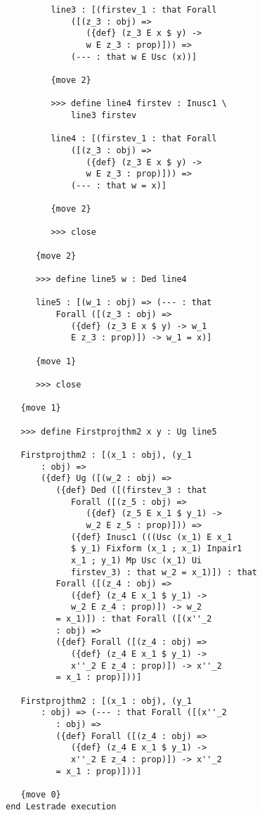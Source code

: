 \documentclass[12pt]{article}
\begin{document}
\begin{verbatim}
         line3 : [(firstev_1 : that Forall 
             ([(z_3 : obj) => 
                ({def} (z_3 E x $ y) -> 
                w E z_3 : prop)])) => 
             (--- : that w E Usc (x))]

         {move 2}

         >>> define line4 firstev : Inusc1 \
             line3 firstev

         line4 : [(firstev_1 : that Forall 
             ([(z_3 : obj) => 
                ({def} (z_3 E x $ y) -> 
                w E z_3 : prop)])) => 
             (--- : that w = x)]

         {move 2}

         >>> close

      {move 2}

      >>> define line5 w : Ded line4

      line5 : [(w_1 : obj) => (--- : that 
          Forall ([(z_3 : obj) => 
             ({def} (z_3 E x $ y) -> w_1 
             E z_3 : prop)]) -> w_1 = x)]

      {move 1}

      >>> close

   {move 1}

   >>> define Firstprojthm2 x y : Ug line5

   Firstprojthm2 : [(x_1 : obj), (y_1 
       : obj) => 
       ({def} Ug ([(w_2 : obj) => 
          ({def} Ded ([(firstev_3 : that 
             Forall ([(z_5 : obj) => 
                ({def} (z_5 E x_1 $ y_1) -> 
                w_2 E z_5 : prop)])) => 
             ({def} Inusc1 (((Usc (x_1) E x_1 
             $ y_1) Fixform (x_1 ; x_1) Inpair1 
             x_1 ; y_1) Mp Usc (x_1) Ui 
             firstev_3) : that w_2 = x_1)]) : that 
          Forall ([(z_4 : obj) => 
             ({def} (z_4 E x_1 $ y_1) -> 
             w_2 E z_4 : prop)]) -> w_2 
          = x_1)]) : that Forall ([(x''_2 
          : obj) => 
          ({def} Forall ([(z_4 : obj) => 
             ({def} (z_4 E x_1 $ y_1) -> 
             x''_2 E z_4 : prop)]) -> x''_2 
          = x_1 : prop)]))]

   Firstprojthm2 : [(x_1 : obj), (y_1 
       : obj) => (--- : that Forall ([(x''_2 
          : obj) => 
          ({def} Forall ([(z_4 : obj) => 
             ({def} (z_4 E x_1 $ y_1) -> 
             x''_2 E z_4 : prop)]) -> x''_2 
          = x_1 : prop)]))]

   {move 0}
end Lestrade execution
\end{verbatim}
\end{document}

